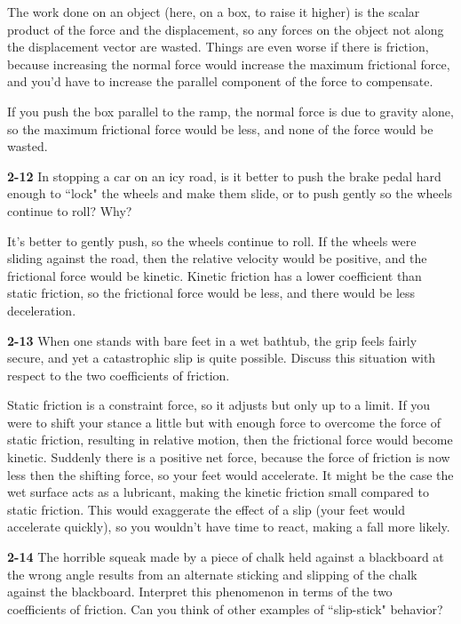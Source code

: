 \documentclass{amsart}
\begin{document}
The work done on an object (here, on a box, to raise it higher) is the scalar product of the force
and the displacement, so any forces on the object not along the displacement vector are wasted.
Things are even worse if there is friction, because increasing the normal force would increase the maximum
frictional force, and you'd have to increase the parallel component of the force to compensate.

If you push the box parallel to the ramp, the normal force is due to gravity alone, so the maximum frictional force
would be less, and none of the force would be wasted.

\vspace{\baselineskip}

\noindent
\textbf{2-12} In stopping a car on an icy road, is it better to push the brake pedal hard enough to ``lock"
the wheels and make them slide, or to push gently so the wheels continue to roll?  Why?

It's better to gently push, so the wheels continue to roll.  If the wheels were sliding against the road,
then the relative velocity would be positive, and the frictional force would be kinetic.
Kinetic friction has a lower coefficient than static friction, so the frictional force would be less,
and there would be less deceleration.

\vspace{\baselineskip}

\noindent
\textbf{2-13} When one stands with bare feet in a wet bathtub, the grip feels fairly secure,
and yet a catastrophic slip is quite possible.
Discuss this situation with respect to the two coefficients of friction.

Static friction is a constraint force, so it adjusts but only up to a limit.
If you were to shift your stance a little but with enough force to overcome the force of static friction,
resulting in relative motion, then the frictional force would become kinetic.
Suddenly there is a positive net force, because the force of friction is now less then the shifting force,
so your feet would accelerate.
It might be the case the wet surface acts as a lubricant, making the kinetic friction small compared to static friction.
This would exaggerate the effect of a slip (your feet would accelerate quickly), so you wouldn't have time to react,
making a fall more likely.

\vspace{\baselineskip}

\noindent
\textbf{2-14} The horrible squeak made by a piece of chalk held against a blackboard at the wrong angle results
from an alternate sticking and slipping of the chalk against the blackboard.
Interpret this phenomenon in terms of the two coefficients of friction.
Can you think of other examples of ``slip-stick" behavior?
\end{document}
